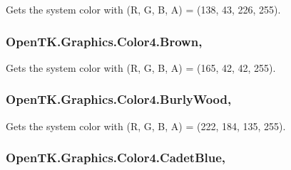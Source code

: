 Gets the system color with (R, G, B, A) = (138, 43, 226, 255). 

\hypertarget{struct_open_t_k_1_1_graphics_1_1_color4_a5648e4713f111695c7b6528e55178d08}{
\subsubsection[{Brown}]{ Open\-T\-K.\-Graphics.\-Color4.\-Brown\hspace{0.3cm}{\ttfamily [static]}, {\ttfamily [get]}}}\label{struct_open_t_k_1_1_graphics_1_1_color4_a5648e4713f111695c7b6528e55178d08}


Gets the system color with (R, G, B, A) = (165, 42, 42, 255). 

\hypertarget{struct_open_t_k_1_1_graphics_1_1_color4_af9877e482b09f11c6dd853cf52e2fb30}{
\subsubsection[{Burly\-Wood}]{ Open\-T\-K.\-Graphics.\-Color4.\-Burly\-Wood\hspace{0.3cm}{\ttfamily [static]}, {\ttfamily [get]}}}\label{struct_open_t_k_1_1_graphics_1_1_color4_af9877e482b09f11c6dd853cf52e2fb30}


Gets the system color with (R, G, B, A) = (222, 184, 135, 255). 

\hypertarget{struct_open_t_k_1_1_graphics_1_1_color4_a9f94587869d7ce96b37667b6284a45e8}{
\subsubsection[{Cadet\-Blue}]{ Open\-T\-K.\-Graphics.\-Color4.\-Cadet\-Blue\hspace{0.3cm}{\ttfamily [static]}, {\ttfamily [get]}}}\label{struct_open_t_k_1_1_graphics_1_1_color4_a9f94587869d7ce96b37667b6284a45e8}


